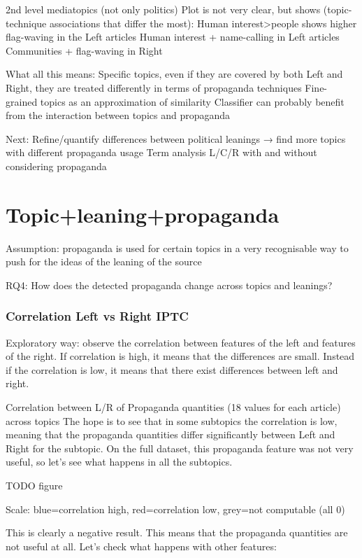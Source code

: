 2nd level mediatopics (not only politics)
Plot is not very clear, but shows (topic-technique associations that differ the most):
Human interest>people shows higher flag-waving in the Left articles
Human interest + name-calling in Left articles
Communities + flag-waving in Right

What all this means:
Specific topics, even if they are covered by both Left and Right, they are treated differently in terms of propaganda techniques
Fine-grained topics as an approximation of similarity
Classifier can probably benefit from the interaction between topics and propaganda

Next:
Refine/quantify differences between political leanings → find more topics with different propaganda usage
Term analysis L/C/R with and without considering propaganda





\section{Topic+leaning+propaganda}

Assumption: propaganda is used for certain topics in a very recognisable way to push for the ideas of the leaning of the source

RQ4: How does the detected propaganda change across topics and leanings? 

\subsubsection{Correlation Left vs Right IPTC}
Exploratory way: observe the correlation between features of the left and features of the right. If correlation is high, it means that the differences are small. Instead if the correlation is low, it means that there exist differences between left and right.


Correlation between L/R of Propaganda quantities (18 values for each article) across topics
The hope is to see that in some subtopics the correlation is low, meaning that the propaganda quantities differ significantly between Left and Right for the subtopic.
On the full dataset, this propaganda feature was not very useful, so let’s see what happens in all the subtopics.

TODO figure

Scale: blue=correlation high, red=correlation low, grey=not computable (all 0)

This is clearly a negative result. This means that the propaganda quantities are not useful at all. Let’s check what happens with other features:


